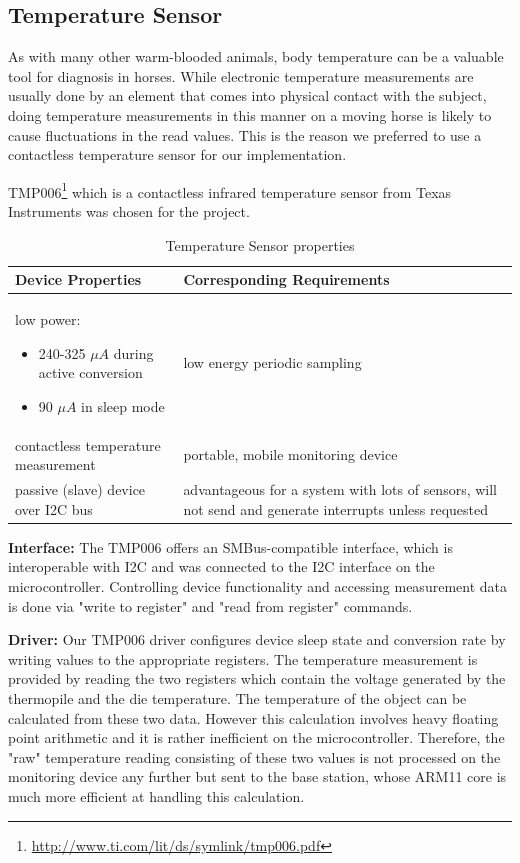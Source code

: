 \subsection{Temperature Sensor}

As with many other warm-blooded animals, body temperature can be a valuable tool for diagnosis in horses. While electronic temperature measurements are usually done by an element that comes into physical contact with the subject, doing temperature measurements in this manner on a moving horse is likely to cause fluctuations in the read values. This is the reason we preferred to use a contactless temperature sensor for our implementation. 

TMP006\footnote{\url{http://www.ti.com/lit/ds/symlink/tmp006.pdf}} which is a contactless infrared temperature sensor from Texas Instruments was chosen for the project. 


\begin{table}[htb]
\centering
\begin{tabular}{|m{}|m{}|}
\hline 
	\textbf{Device Properties} &
	\textbf{Corresponding Requirements}  \\ 
\hline
	low power:
	\begin{itemize}
	\item 240-325 $\mu A$ during active conversion
	\item 90 $\mu A$ in sleep mode 
	\end{itemize}  &
	low energy periodic sampling  \\ 
\hline
	contactless temperature measurement &
	portable, mobile monitoring device \\
\hline
	passive (slave) device over I2C bus &
	advantageous for a system with lots of sensors, will not send and generate interrupts unless requested \\
\hline 
\end{tabular} 
\caption{Temperature Sensor properties}
\label{tab:temp_sensor_properties}
\end{table}

\textbf{Interface:} The TMP006 offers an SMBus-compatible interface, which is interoperable with I2C and was connected to the I2C interface on the microcontroller. Controlling device functionality and accessing measurement data is done via "write to register" and "read from register" commands. 

\textbf{Driver:} Our TMP006 driver configures device sleep state and conversion rate by writing values to the appropriate registers. The temperature measurement is provided by reading the two registers which contain the voltage generated by the thermopile and the die temperature. The temperature of the object can be calculated from these two data. However this calculation involves heavy floating point arithmetic and it is rather inefficient on the microcontroller. Therefore, the "raw" temperature reading consisting of these two values is not processed on the monitoring device any further but sent to the base station, whose ARM11 core is much more efficient at handling this calculation. 



